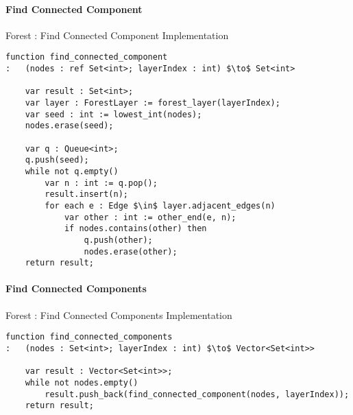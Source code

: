 \paragraph{Find Connected Component}

\begin{stulisting}[H]
\caption{Forest : Find Connected Component Implementation}
\begin{lstlisting}[style=Default]
function find_connected_component
:	(nodes : ref Set<int>; layerIndex : int) $\to$ Set<int>

	var result : Set<int>;
	var layer : ForestLayer := forest_layer(layerIndex);
	var seed : int := lowest_int(nodes);
	nodes.erase(seed);

	var q : Queue<int>;
	q.push(seed);
	while not q.empty()
		var n : int := q.pop();
		result.insert(n);
		for each e : Edge $\in$ layer.adjacent_edges(n)
			var other : int := other_end(e, n);
			if nodes.contains(other) then
				q.push(other);
				nodes.erase(other);
	return result;
\end{lstlisting}
\end{stulisting}

\paragraph{Find Connected Components}

\begin{stulisting}[H]
\caption{Forest : Find Connected Components Implementation}
\begin{lstlisting}[style=Default]
function find_connected_components
:	(nodes : Set<int>; layerIndex : int) $\to$ Vector<Set<int>>

	var result : Vector<Set<int>>;
	while not nodes.empty()
		result.push_back(find_connected_component(nodes, layerIndex));
	return result;
\end{lstlisting}
\end{stulisting}